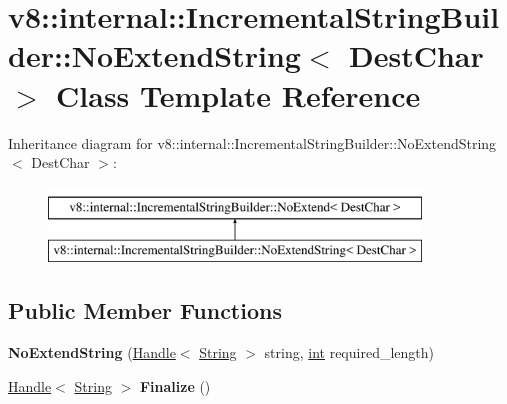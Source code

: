 \hypertarget{classv8_1_1internal_1_1IncrementalStringBuilder_1_1NoExtendString}{}\section{v8\+:\+:internal\+:\+:Incremental\+String\+Builder\+:\+:No\+Extend\+String$<$ Dest\+Char $>$ Class Template Reference}
\label{classv8_1_1internal_1_1IncrementalStringBuilder_1_1NoExtendString}
Inheritance diagram for v8\+:\+:internal\+:\+:Incremental\+String\+Builder\+:\+:No\+Extend\+String$<$ Dest\+Char $>$\+:\begin{figure}[H]
\begin{center}
\leavevmode
\includegraphics[height=2.000000cm]{classv8_1_1internal_1_1IncrementalStringBuilder_1_1NoExtendString}
\end{center}
\end{figure}
\subsection*{Public Member Functions}
\begin{DoxyCompactItemize}
\item 
\mbox{\label{classv8_1_1internal_1_1IncrementalStringBuilder_1_1NoExtendString_aaf7a7f8934920386b38fb930e4aa7a67}} 
{\bfseries No\+Extend\+String} (\mbox{\hyperlink{classv8_1_1internal_1_1Handle}{Handle}}$<$ \mbox{\hyperlink{classv8_1_1internal_1_1String}{String}} $>$ string, \mbox{\hyperlink{classint}{int}} required\+\_\+length)
\item 
\mbox{\label{classv8_1_1internal_1_1IncrementalStringBuilder_1_1NoExtendString_a1b8e59489ef4db1119fdf65512e84667}} 
\mbox{\hyperlink{classv8_1_1internal_1_1Handle}{Handle}}$<$ \mbox{\hyperlink{classv8_1_1internal_1_1String}{String}} $>$ {\bfseries Finalize} ()
\end{DoxyCompactItemize}


